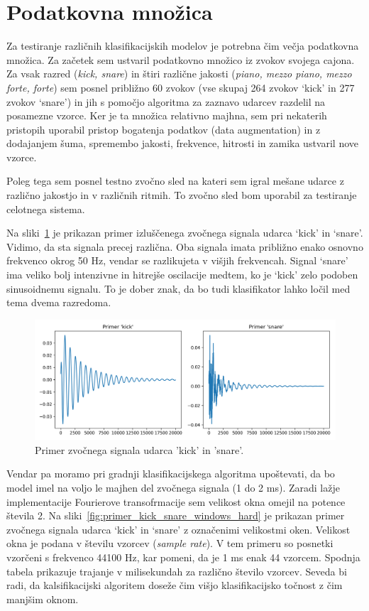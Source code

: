 \documentclass[11pt,a4paper]{article}
\begin{document}
\section{Podatkovna množica}
Za testiranje različnih klasifikacijskih modelov je potrebna čim večja podatkovna množica. Za začetek sem ustvaril podatkovno množico iz zvokov svojega cajona. Za vsak razred (\emph{kick, snare}) in štiri različne jakosti (\emph{piano, mezzo piano, mezzo forte, forte}) sem posnel približno 60 zvokov (vse skupaj 264 zvokov `kick' in 277 zvokov `snare') in jih s pomočjo algoritma za zaznavo udarcev razdelil na posamezne vzorce. Ker je ta množica relativno majhna, sem pri nekaterih pristopih uporabil pristop bogatenja podatkov (data augmentation) in z dodajanjem šuma, spremembo jakosti, frekvence, hitrosti in zamika ustvaril nove vzorce.

Poleg tega sem posnel testno zvočno sled na kateri sem igral mešane udarce z različno jakostjo in v različnih ritmih. To zvočno sled bom uporabil za testiranje celotnega sistema.

Na sliki~\ref{fig:primer_kick_snare} je prikazan primer izluščenega zvočnega signala udarca `kick' in `snare'. Vidimo, da sta signala precej različna. Oba signala imata približno enako osnovno frekvenco okrog 50 Hz, vendar se razlikujeta v višjih frekvencah. Signal `snare' ima veliko bolj intenzivne in hitrejše oscilacije medtem, ko je `kick' zelo podoben sinusoidnemu signalu. To je dober znak, da bo tudi klasifikator lahko ločil med tema dvema razredoma.

\begin{figure}[h]
    \centering
    \includegraphics[width=\textwidth]{img/primer_kick_snare.png}
    \caption{Primer zvočnega signala udarca 'kick' in 'snare'.}
    \label{fig:primer_kick_snare}
\end{figure}

Vendar pa moramo pri gradnji klasifikacijskega algoritma upoštevati, da bo model imel na voljo le majhen del zvočnega signala (1 do 2 ms). Zaradi lažje implementacije Fourierove transofrmacije sem velikost okna omejil na potence števila 2. Na sliki~\ref{fig:primer_kick_snare_windows_hard} je prikazan primer zvočnega signala udarca `kick' in `snare' z označenimi velikostmi oken. Velikost okna je podana v številu vzorcev (\emph{sample rate}). V tem primeru so posnetki vzorčeni s frekvenco 44100 Hz, kar pomeni, da je 1 ms enak 44 vzorcem. Spodnja tabela prikazuje trajanje v milisekundah za različno število vzorcev. Seveda bi radi, da kalsifikacijski algoritem doseže čim višjo klasifikacijsko točnost z čim manjšim oknom.
\end{document}
